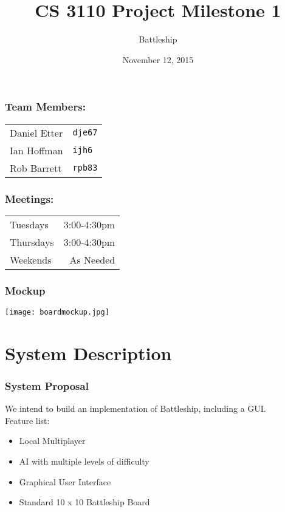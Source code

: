 \documentclass[10pt]{article}
\title{CS 3110 Project Milestone 1}
\author{Battleship}
\date{November 12, 2015}
\begin{document}
\maketitle

\section*{Team Members:}
\begin{tabular}{l l}
Daniel Etter & \texttt{dje67}\\
Ian Hoffman & \texttt{ijh6}\\
Rob Barrett & \texttt{rpb83}\\
\end{tabular}

\section*{Meetings:}
\begin{tabular}{l r}
Tuesdays & 3:00-4:30pm \\
Thursdays & 3:00-4:30pm \\
Weekends & As Needed \\
\end{tabular}

\section*{Mockup}
\texttt{[image: boardmockup.jpg]}

\clearpage
\part*{System Description}
\section*{System Proposal}
We intend to build an implementation of Battleship, including a GUI. \\
Feature list:
\begin{itemize}
    \item Local Multiplayer
    \item AI with multiple levels of difficulty
    \item Graphical User Interface
    \item Standard 10 x 10 Battleship Board
\end{itemize}
\end{document}
